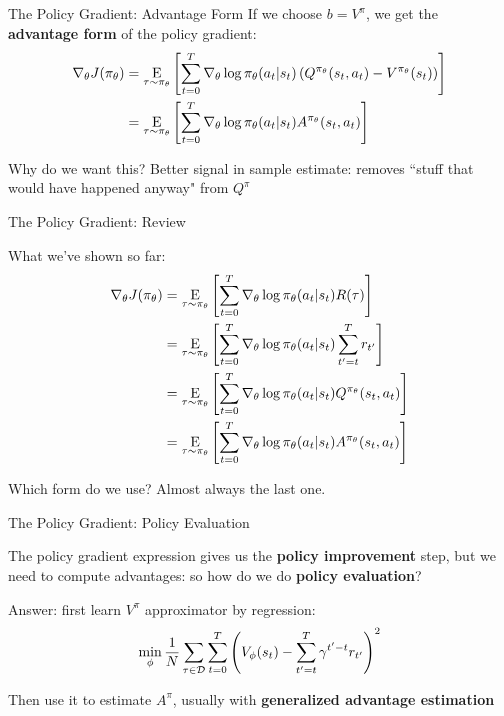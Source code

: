 \documentclass[9pt]{beamer}
\newcommand{\underE}[2]{\underset{\begin{subarray}{c}#1 \end{subarray}}{\E}\left[ #2 \right]}
\begin{document}
\begin{frame}{The Policy Gradient: Advantage Form}
If we choose $b = V^{\pi}$, we get the \textbf{advantage form} of the policy gradient:
%
\begin{align*}
\nabla_{\theta} J(\pi_{\theta}) &=\underE{\tau \sim \pi_{\theta}}{\sum_{t=0}^T \nabla_{\theta} \log \pi_{\theta}(a_t | s_t) \left(Q^{\pi_{\theta}}(s_t, a_t) - V^{\pi_{\theta}}(s_t)\right)}\\
 &=\underE{\tau \sim \pi_{\theta}}{\sum_{t=0}^T \nabla_{\theta} \log \pi_{\theta}(a_t | s_t) A^{\pi_{\theta}}(s_t, a_t)}
\end{align*}

Why do we want this? Better signal in sample estimate: removes ``stuff that would have happened anyway" from $Q^{\pi}$
\end{frame}

\begin{frame}{The Policy Gradient: Review}

What we've shown so far:
%
\begin{align*}
\nabla_{\theta} J(\pi_{\theta}) &=\underE{\tau \sim \pi_{\theta}}{\sum_{t=0}^T \nabla_{\theta} \log \pi_{\theta}(a_t | s_t) R(\tau)}\\ 
&=\underE{\tau \sim \pi_{\theta}}{\sum_{t=0}^T \nabla_{\theta} \log \pi_{\theta}(a_t | s_t) \sum_{t'=t}^T r_{t'}}\\
&=\underE{\tau \sim \pi_{\theta}}{\sum_{t=0}^T \nabla_{\theta} \log \pi_{\theta}(a_t | s_t) Q^{\pi_{\theta}}(s_t, a_t)}\\
 &=\underE{\tau \sim \pi_{\theta}}{\sum_{t=0}^T \nabla_{\theta} \log \pi_{\theta}(a_t | s_t) A^{\pi_{\theta}}(s_t, a_t)}
\end{align*}

Which form do we use? Almost always the last one.

\end{frame}

\begin{frame}{The Policy Gradient: Policy Evaluation}

The policy gradient expression gives us the \textbf{policy improvement} step, but we need to compute advantages: so how do we do \textbf{policy evaluation}?

\vspace{1em}

Answer: first learn $V^{\pi}$ approximator by regression:
%
\begin{equation*}
\min_{\phi} \frac{1}{N}\sum_{\tau \in {\mathcal D}} \sum_{t=0}^T \left(V_{\phi}(s_t) - \sum_{t'=t}^T \gamma^{t'-t} r_{t'}\right)^2
\end{equation*}

Then use it to estimate $A^{\pi}$, usually with \textbf{generalized advantage estimation}

\end{frame}
\end{document}
